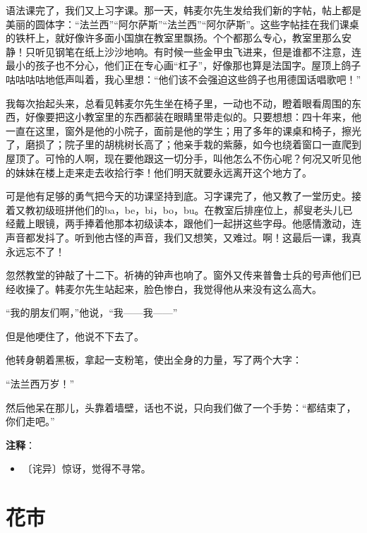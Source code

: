 \documentclass[12pt,UTF-8,openany]{ctexbook}
\begin{document}
\begin{large}
    语法课完了，我们又上习字课。那一天，韩麦尔先生发给我们新的字帖，帖上都是美丽的圆体字：“法兰西”“阿尔萨斯”“法兰西”“阿尔萨斯”。这些字帖挂在我们课桌的铁杆上，就好像许多面小国旗在教室里飘扬。个个都那么专心，教室里那么安静！只听见钢笔在纸上沙沙地响。有时候一些金甲虫飞进来，但是谁都不注意，连最小的孩子也不分心，他们正在专心画“杠子”，好像那也算是法国字。屋顶上鸽子咕咕咕咕地低声叫着，我心里想：“他们该不会强迫这些鸽子也用德国话唱歌吧！”
    
    我每次抬起头来，总看见韩麦尔先生坐在椅子里，一动也不动，瞪着眼看周围的东西，好像要把这小教室里的东西都装在眼睛里带走似的。只要想想：四十年来，他一直在这里，窗外是他的小院子，面前是他的学生；用了多年的课桌和椅子，擦光了，磨损了；院子里的胡桃树长高了；他亲手栽的紫藤，如今也绕着窗口一直爬到屋顶了。可怜的人啊，现在要他跟这一切分手，叫他怎么不伤心呢？何况又听见他的妹妹在楼上走来走去收拾行李！他们明天就要永远离开这个地方了。
    
    可是他有足够的勇气把今天的功课坚持到底。习字课完了，他又教了一堂历史。接着又教初级班拼他们的ba，be，bi，bo，bu。在教室后排座位上，郝叟老头儿已经戴上眼镜，两手捧着他那本初级读本，跟他们一起拼这些字母。他感情激动，连声音都发抖了。听到他古怪的声音，我们又想笑，又难过。啊！这最后一课，我真永远忘不了！
    
    忽然教堂的钟敲了十二下。祈祷的钟声也响了。窗外又传来普鲁士兵的号声他们已经收操了。韩麦尔先生站起来，脸色惨白，我觉得他从来没有这么高大。
    
    “我的朋友们啊，”他说，“我——我——”
    
    但是他哽住了，他说不下去了。
    
    他转身朝着黑板，拿起一支粉笔，使出全身的力量，写了两个大字：
    
    “法兰西万岁！”
    
    然后他呆在那儿，头靠着墙壁，话也不说，只向我们做了一个手势：“都结束了，你们走吧。”
    
\end{large}


\newpage

\textbf{注释}：

\vspace{-1em}

\begin{itemize}
    \setlength\itemsep{-0.2em}
    \item 〔诧异〕惊讶，觉得不寻常。
\end{itemize}

\chapter{花市}
\end{document}

